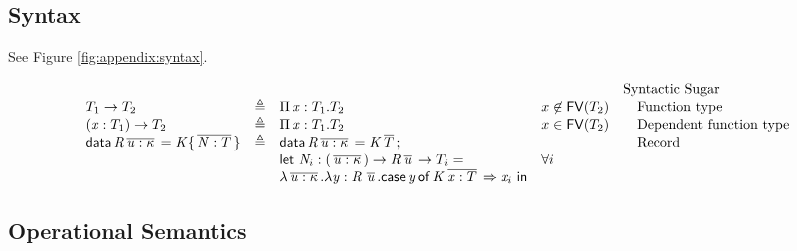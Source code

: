 \subsection{Syntax}
See Figure \ref{fig:appendix:syntax}.
\begin{figure*}
\centering
\gram{\ottpgm\ottinterrule
\ottdecl\ottinterrule
\ottu\ottinterrule
\ottp\ottinterrule
\ottE\ottinterrule
\ottV\ottinterrule
\ottGs}
    \[
    \begin{array}{lllll}
     &&&& \text{Syntactic Sugar} \\
     T_{{\mathrm{1}}}  \rightarrow  T_{{\mathrm{2}}} & \triangleq & \Pi \, \mathit{x}  :  T_{{\mathrm{1}}}  .  T_{{\mathrm{2}}} & x \not \in \mathsf{FV}(T_{{\mathrm{2}}}) & \quad\text{Function type} \\
     (  \mathit{x}  :  T_{{\mathrm{1}}}  )  \rightarrow  T_{{\mathrm{2}}} & \triangleq & \Pi \, \mathit{x}  :  T_{{\mathrm{1}}}  .  T_{{\mathrm{2}}} & x \in \mathsf{FV}(T_{{\mathrm{2}}}) & \quad\text{Dependent function type} \\
     \mathsf{data} \, \mathit{R}  \,\overline{  \mathit{u}  :  \kappa  }\,  =  \mathit{K}  \{  \,\overline{  \mathit{N}  :  T  }\,  \} & \triangleq &
                    \mathsf{data} \, \mathit{R}  \,\overline{  \mathit{u}  :  \kappa  }\,  =  \mathit{K}  \,\overline{  T  }\,; && \quad\text{Record} \\
                  &&  \mathsf{let} ~\mathit{N}_i : (  \,\overline{  \mathit{u}  :  \kappa  }\,  )  \rightarrow  \mathit{R}    \,\overline{  \mathit{u}  }\,  \rightarrow  T_i = & \forall i &  \\
                  && \lambda  \,\overline{  \mathit{u}  :  \kappa  }\,  .  \lambda  \mathit{y}  :  \mathit{R} \, \,\overline{  \mathit{u}  }\,  .  \mathsf{case} \, \mathit{y} \, \mathsf{of} \, \mathit{K}  \,\overline{  \mathit{x}  :  T  }\,  \Rightarrow  \mathit{x}_i~ \mathsf{in}  && \\
    \end{array}
    \]
\caption{Syntax of source language}
\label{fig:appendix:syntax}
\end{figure*}

\subsection{Operational Semantics}
\ottdefnstepsrc{}
\ottusedrule{\ottdruleSCXXCaseMatch{}}

